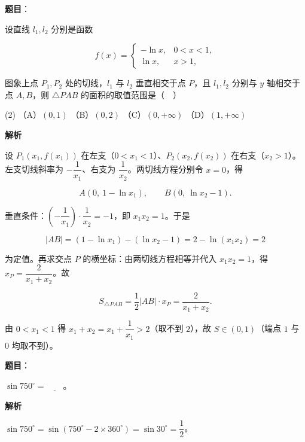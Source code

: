 \begin{answer}

\textbf{题目}：

设直线 \(l_{1},l_{2}\) 分别是函数

\nopagebreak[4]
\[
f(x)=\begin{cases}
-\ln x, & 0<x<1,\\
\ln x, & x>1,
\end{cases}
\]

图象上点 \(P_{1},P_{2}\) 处的切线，\(l_{1}\) 与 \(l_{2}\) 垂直相交于点 \(P\)，且 \(l_{1},l_{2}\) 分别与 \(y\) 轴相交于点 \(A,B\)，则 \(\triangle PAB\) 的面积的取值范围是（　）

\begin{gkopts}(2)
\task （A）\((0,1)\)
\task （B）\((0,2)\)
\task （C）\((0,+\infty)\)
\task （D）\((1,+\infty)\)
\end{gkopts}

\textbf{解析}

设 \(P_1(x_1,f(x_1))\) 在左支（\(0<x_1<1\)）、\(P_2(x_2,f(x_2))\) 在右支（\(x_2>1\)）。左支切线斜率为 \(-\dfrac{1}{x_1}\)、右支为 \(\dfrac{1}{x_2}\)。两切线方程分别令 \(x=0\)，得

\nopagebreak[4]
\[
A(0,\ 1-\ln x_1),\qquad B(0,\ \ln x_2-1).
\]

垂直条件：\(\left(-\dfrac{1}{x_1}\right)\cdot\dfrac{1}{x_2}=-1\)，即 \(x_1x_2=1\)。于是

\nopagebreak[4]
\[
|AB|=(1-\ln x_1)-(\ln x_2-1)=2-\ln(x_1x_2)=2
\]

为定值。再求交点 \(P\) 的横坐标：由两切线方程相等并代入 \(x_1x_2=1\)，得 \(x_P=\dfrac{2}{x_1+x_2}\)。故

\nopagebreak[4]
\[
S_{\triangle PAB}=\frac{1}{2}|AB|\cdot x_P=\frac{2}{x_1+x_2}.
\]

由 \(0<x_1<1\) 得 \(x_1+x_2=x_1+\dfrac{1}{x_1}>2\)（取不到 \(2\)），故 \(S\in(0,1)\)（端点 \(1\) 与 \(0\) 均取不到）。


\end{answer}
\begin{answer}

\textbf{题目}：

\(\sin 750^{\circ}=\underline{\qquad}\)。

\textbf{解析}

\(\sin 750^{\circ}=\sin(750^{\circ}-2\times360^{\circ})=\sin 30^{\circ}=\dfrac{1}{2}\)。


\end{answer}
